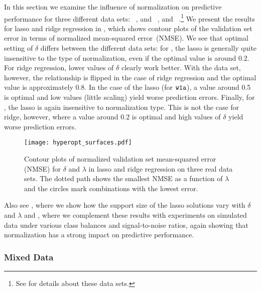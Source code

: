 In this section we examine the influence of normalization on predictive performance for
three different data sets: ~\citep{rhee2006}, and
~\citep{chen2004}, and
~\citep{hirst1994,king1995}.\footnote{See  for
  details about these data sets.} We present the results for lasso and ridge regression in
, which shows contour plots of the validation set error in
terms of normalized mean-squared error~(NMSE). We see that optimal setting of \(\delta\)
differs between the different data sets: for , the lasso is generally quite
insensitive to the type of normalization, even if the optimal value is around 0.2. For
ridge regression, lower values of \(\delta\) clearly work better. With the  data
set, however, the relationship is flipped in the case of ridge regression and the optimal
value is approximately 0.8. In the case of the lasso (for \(\texttt{w1a}\)), a value around
0.5 is optimal and low values (little scaling) yield worse prediction errors. Finally, for
, the lasso is again insensitive to normalization type. This is not the case
for ridge, however, where a value around 0.2 is optimal and high values of \(\delta\) yield
worse prediction errors.

\begin{figure}[htpb]
  \centering
  \texttt{[image: hyperopt\_surfaces.pdf]}
  \caption{%
    Contour plots of normalized validation set mean-squared error (NMSE)
    for \(\delta\) and \(\lambda\) in lasso and ridge regression on
    three real data sets. The
    dotted path shows the smallest NMSE as a function of \(\lambda\) and the circles mark
    combinations with the lowest error.
  }
  \label{fig:hyperopt-contours}
\end{figure}

Also see , where we show how the support size of
the lasso solutions vary with \(\delta\) and \(\lambda\) and
, where we complement these results with
experiments on simulated data under various class balances and signal-to-noise ratios,
again showing that normalization has a strong impact on predictive performance.

\subsubsection{Mixed Data}\label{sec:experiments-mixed-data}

